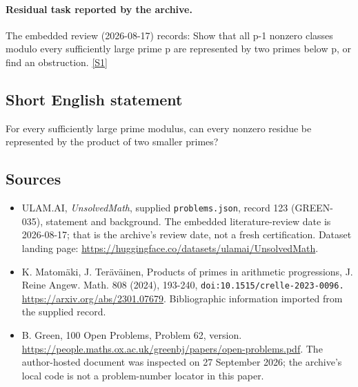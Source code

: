 \documentclass[11pt,a4paper]{article}
\newcommand{\sref}[2]{\hyperlink{source:#1:#2}{[S#2]}}
\begin{document}
\paragraph{Residual task reported by the archive.}

The embedded review (2026-08-17) records: Show that all p-1 nonzero classes modulo every sufficiently large prime p are represented by two primes below p, or find an obstruction. \sref{123}{1}

\subsection{Short English statement}

For every sufficiently large prime modulus, can every nonzero residue be represented by the product of two smaller primes?

\subsection{Sources}

{\small

\begin{itemize}

\item[\hypertarget{source:123:1}{S1}] ULAM.AI, \emph{UnsolvedMath}, supplied \texttt{problems.json}, record 123 (GREEN-035), statement and background. The embedded literature-review date is 2026-08-17; that is the archive’s review date, not a fresh certification. Dataset landing page: \url{https://huggingface.co/datasets/ulamai/UnsolvedMath}.

\item[\hypertarget{source:123:2}{S2}] K. Matomäki, J. Teräväinen, Products of primes in arithmetic progressions, J. Reine Angew. Math. 808 (2024), 193-240, \nolinkurl{doi:10.1515/crelle-2023-0096.} \url{https://arxiv.org/abs/2301.07679}. Bibliographic information imported from the supplied record.

\item[\hypertarget{source:123:3}{S3}] B. Green, 100 Open Problems, Problem 62, version. \url{https://people.maths.ox.ac.uk/greenbj/papers/open-problems.pdf}. The author-hosted document was inspected on 27 September 2026; the archive’s local code is not a problem-number locator in this paper.

\end{itemize}

}

\label{end:123}
\end{document}
